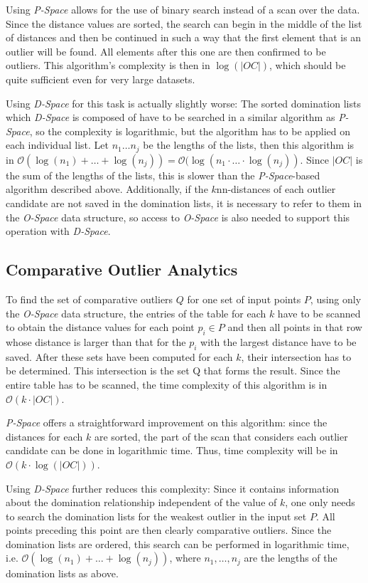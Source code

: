\documentclass[runningheads]{llncs}
\begin{document}
Using \emph{P-Space} allows for the use of binary search instead of a scan over the data. Since the distance values are sorted, the search can begin in the middle of the list of distances and then be continued in such a way that the first element that is an outlier will be found. All elements after this one are then confirmed to be outliers. This algorithm's complexity is then in $\log(|OC|)$, which should be quite sufficient even for very large datasets.

Using \emph{D-Space} for this task is actually slightly worse: The sorted domination lists which \emph{D-Space} is composed of have to be searched in a similar algorithm as \emph{P-Space}, so the complexity is logarithmic, but the algorithm has to be applied on each individual list. Let $n_1 \ldots n_j$ be the lengths of the lists, then this algorithm is in $\mathcal{O}(\log(n_1) + \ldots + \log(n_j)) = \mathcal{O}(\log(n_1 \cdot \ldots \cdot \log(n_j))$. Since $|OC|$ is the sum of the lengths of the lists, this is slower than the \emph{P-Space}-based algorithm described above. Additionally, if the $k$nn-distances of each outlier candidate are not saved in the domination lists, it is necessary to refer to them in the \emph{O-Space} data structure, so access to \emph{O-Space} is also needed to support this operation with \emph{D-Space}.
\subsection{Comparative Outlier Analytics}

To find the set of comparative outliers $Q$ for one set of input points $P$, using only the \emph{O-Space} data structure, the entries of the table for each $k$ have to be scanned to obtain the distance values for each point $p_i\in P$ and then all points in that row whose distance is larger than that for the $p_i$ with the largest distance have to be saved. After these sets have been computed for each $k$, their intersection has to be determined. This intersection is the set Q that forms the result. Since the entire table has to be scanned, the time complexity of this algorithm is in $\mathcal{O}(k\cdot |OC|)$.

\emph{P-Space} offers a straightforward improvement on this algorithm: since the distances for each $k$ are sorted, the part of the scan that considers each outlier candidate can be done in logarithmic time. Thus, time complexity will be in $\mathcal{O}(k\cdot \log(|OC|))$.

Using \emph{D-Space} further reduces this complexity: Since it contains information about the domination relationship independent of the value of $k$, one only needs to search the domination lists for the weakest outlier in the input set $P$. All points preceding this point are then clearly comparative outliers. Since the domination lists are ordered, this search can be performed in logarithmic time, i.e. $\mathcal{O}(\log(n_1) + \ldots + \log(n_j))$, where $n_1, \ldots , n_j$ are the lengths of the domination lists as above.
\end{document}
